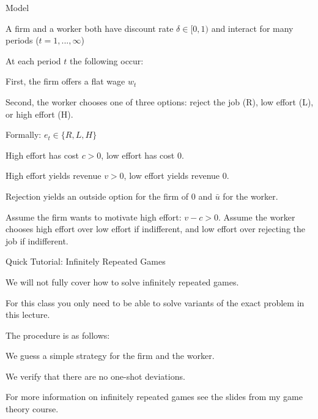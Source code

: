 \documentclass[aspectratio=169,usenames,dvipsnames]{beamer}
\newenvironment{wideitemize}{\itemize\addtolength{\itemsep}{10pt}}{\enditemize}
\begin{document}
\begin{frame}{Model}
\begin{wideitemize}
    \item A firm and a worker both have discount rate $\delta\in [0,1)$ and interact for many periods ($t=1,...,\infty$)
    \item At each period $t$ the following occur:
    \begin{wideitemize}
        \item First, the firm offers a flat wage $w_t$
        \item Second, the worker chooses one of three options: reject the job (R), low effort (L), or high effort (H).
        \begin{wideitemize}
            \item Formally: $e_t \in \{R,L,H\}$
        \end{wideitemize}
    \end{wideitemize}
    \item High effort has cost $c>0$, low effort has cost 0.
    \item High effort yields revenue $v>0$, low effort yields revenue 0.
    \item Rejection yields an outside option for the firm of 0 and $\bar u$ for the worker.
    \item Assume the firm wants to motivate high effort: $v-c>0$. Assume the worker chooses high effort over low effort if indifferent, and low effort over rejecting the job if indifferent.
\end{wideitemize}
    
\end{frame}

\begin{frame}{Quick Tutorial: Infinitely Repeated Games}
\begin{wideitemize}
    \item We will not fully cover how to solve infinitely repeated games.
    \item For this class you only need to be able to solve variants of the exact problem in this lecture.
    \item The procedure is as follows:
    \begin{wideitemize}
        \item We guess a simple strategy for the firm and the worker.
        \item We verify that there are no one-shot deviations.
    \end{wideitemize}
    \item For more information on infinitely repeated games see the slides from my game theory course.
\end{wideitemize}
    
\end{frame}
\end{document}
